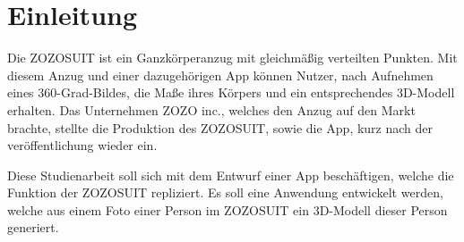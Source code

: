 \chapter{Einleitung}

Die ZOZOSUIT ist ein Ganzkörperanzug mit gleichmäßig verteilten Punkten. Mit diesem Anzug und einer dazugehörigen App können Nutzer, nach Aufnehmen eines 360-Grad-Bildes, die Maße ihres 
Körpers und ein entsprechendes 3D-Modell erhalten. \newline
Das Unternehmen ZOZO inc., welches den Anzug auf den Markt brachte, stellte die Produktion des ZOZOSUIT, sowie die App, kurz nach der veröffentlichung wieder ein.

Diese Studienarbeit soll sich mit dem Entwurf einer App beschäftigen, welche die Funktion der ZOZOSUIT repliziert. Es soll eine Anwendung entwickelt werden, welche aus einem Foto einer 
Person im ZOZOSUIT ein 3D-Modell dieser Person generiert.